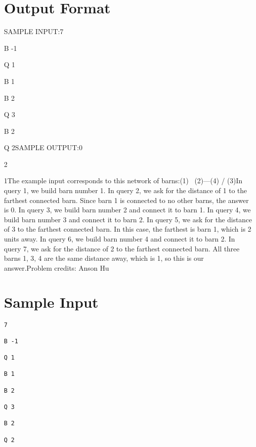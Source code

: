 \documentclass[12pt]{article}
\begin{document}
\section*{Output Format}
SAMPLE INPUT:7

B -1

Q 1

B 1

B 2

Q 3

B 2

Q 2SAMPLE OUTPUT:0

2

1The example input corresponds to this network of barns:(1) 
    \   
     (2)---(4)
    /
  (3)In query 1, we build barn number 1. In query 2, we ask for the distance of 1 to
the farthest connected barn. Since barn 1 is connected to no other barns, the
answer is 0. In query 3, we build barn number 2 and connect it to barn 1. In
query 4, we build barn number 3 and connect it to barn 2. In query 5, we ask for
the distance of 3 to the farthest connected barn. In this case, the farthest is
barn 1, which is 2 units away. In query 6, we build barn number 4 and connect it
to barn 2. In query 7, we ask for the distance of 2 to the farthest connected
barn. All three barns 1, 3, 4 are the same distance away, which is 1, so this is
our answer.Problem credits: Anson Hu

\section*{Sample Input}
\begin{verbatim}
7

B -1

Q 1

B 1

B 2

Q 3

B 2

Q 2
\end{verbatim}
\end{document}
